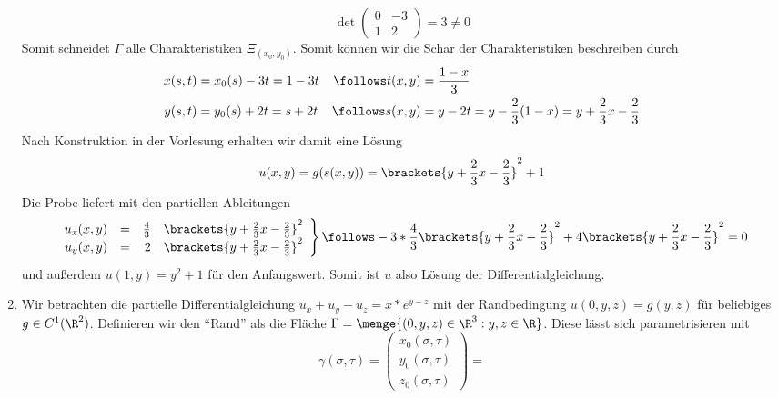 \begin{exercisePage}[Charakteristikenmethode]
\begin{enumerate}[label=(zu \alph*), leftmargin=*]
		\begin{equation*}
			\det\begin{pmatrix} 0 & -3 \\ 1 & 2\end{pmatrix} = 3 \neq 0
		\end{equation*}
		Somit schneidet $\Gamma$ alle Charakteristiken $\Xi_{(x_0,y_0)}$. Somit können wir die Schar der Charakteristiken beschreiben durch 
		\begin{equation*}
			\begin{aligned}
				x(s,t) &= x_0(s) - 3t = 1 - 3t & \follows t(x,y) &= \frac{1-x}{3} \\
				y(s,t) &= y_0(s) + 2t = s + 2t & \follows s(x,y) &= y - 2t = y - \frac{2}{3} (1-x) = y + \frac{2}{3} x - \frac{2}{3}
			\end{aligned}
		\end{equation*}
		Nach Konstruktion in der Vorlesung erhalten wir damit eine Lösung 
		\begin{equation*}
			u(x,y) = g(s(x,y)) = \brackets{y + \frac{2}{3} x - \frac{2}{3}}^2 + 1
		\end{equation*}
		Die Probe liefert mit den partiellen Ableitungen
		\begin{equation*}
			\left. \begin{array}{rcrl}
			u_x(x,y) &=& \frac{4}{3} & \brackets{y + \frac{2}{3} x - \frac{2}{3}}^2 \\
			u_y(x,y) &=& 2  & \brackets{y + \frac{2}{3} x - \frac{2}{3}}^2
			\end{array} \right\} 
			\follows -3 * \frac{4}{3} \brackets{y + \frac{2}{3} x - \frac{2}{3}}^2 + 4 \brackets{y + \frac{2}{3} x - \frac{2}{3}}^2 = 0
		\end{equation*}
		und außerdem $u(1,y) = y^2 + 1$ für den Anfangswert.
		Somit ist $u$ also Lösung der Differentialgleichung.
		\item Wir betrachten die partielle Differentialgleichung $u_x + u_y - u_z = x*e^{y-z}$ mit der Randbedingung $u(0,y,z) = g(y,z)$ für beliebiges $g \in C^1(\R^2)$. Definieren wir den \enquote{Rand} als die Fläche $\Gamma = \menge{(0,y,z) \in \R^3 : y,z \in \R}$. Diese lässt sich parametrisieren mit
		\begin{equation*}
			\gamma(\sigma, \tau) = 
			\begin{pmatrix} 
				x_0(\sigma, \tau) \\ 
				y_0(\sigma, \tau) \\ 
				z_0(\sigma, \tau) 
			\end{pmatrix} 
			= 

\end{equation*}
\end{enumerate}
\end{exercisePage}
